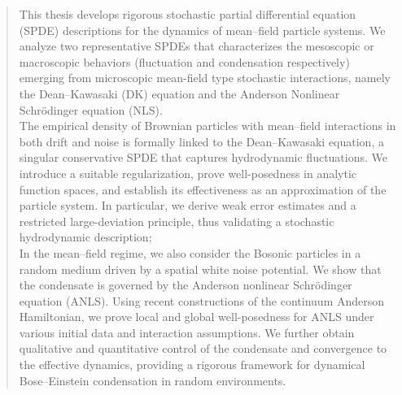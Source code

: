 \begin{abstract}
This thesis develops rigorous stochastic partial differential equation (SPDE) descriptions for the dynamics of mean–field particle systems. We analyze two representative SPDEs that characterizes the mesoscopic or macroscopic behaviors (fluctuation and condensation respectively) emerging from microscopic mean-field type stochastic interactions, namely the Dean--Kawasaki (DK) equation and the Anderson Nonlinear Schrödinger equation (NLS).\\

The empirical density of Brownian particles with mean–field interactions in both drift and noise is formally linked to the Dean–Kawasaki equation, a singular conservative SPDE that captures hydrodynamic fluctuations. We introduce a suitable regularization, prove well-posedness in analytic function spaces, and establish its effectiveness as an approximation of the particle system. In particular, we derive weak error estimates and a restricted large-deviation principle, thus validating a stochastic hydrodynamic description;\\

In the mean–field regime, we also consider the Bosonic particles in a random medium driven by a spatial white noise potential. We show that the condensate is governed by the Anderson nonlinear Schrödinger equation (ANLS). Using recent constructions of the continuum Anderson Hamiltonian, we prove local and global well-posedness for ANLS under various initial data and interaction assumptions. We further obtain qualitative and quantitative control of the condensate and convergence to the effective dynamics, providing a rigorous framework for dynamical Bose–Einstein condensation in random environments.
\end{abstract}

